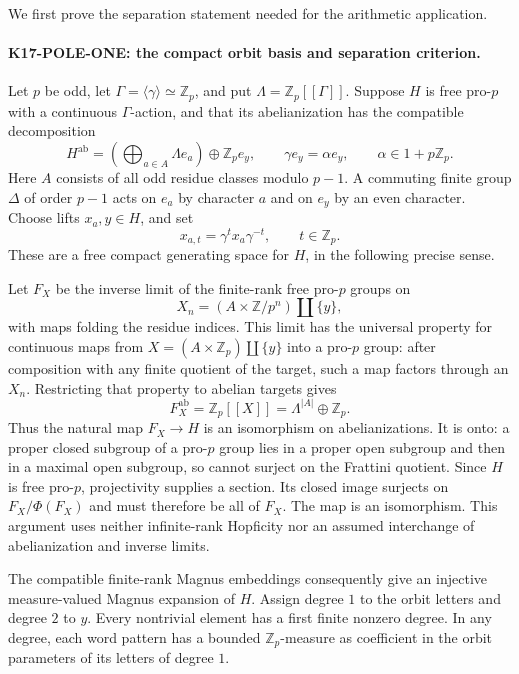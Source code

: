 \documentclass[11pt,a4paper]{article}
\theoremstyle{definition}
\begin{document}
We first prove the separation statement needed for the arithmetic application.

\paragraph{K17-POLE-ONE: the compact orbit basis and separation criterion.}
Let $p$ be odd, let $\Gamma=\langle\gamma\rangle\simeq\mathbb Z_p$, and put $\Lambda=\mathbb Z_p[[\Gamma]]$. Suppose $H$ is free pro-$p$ with a continuous $\Gamma$-action, and that its abelianization has the compatible decomposition
\[
 H^{\mathrm{ab}}=
 \left(\bigoplus_{a\in A}\Lambda e_a\right)\oplus\mathbb Z_p e_y,
 \qquad \gamma e_y=\alpha e_y,\qquad \alpha\in1+p\mathbb Z_p.       \tag{N.1}
\]
Here $A$ consists of all odd residue classes modulo $p-1$. A commuting finite group $\Delta$ of order $p-1$ acts on $e_a$ by character $a$ and on $e_y$ by an even character. Choose lifts $x_a,y\in H$, and set
\[
 x_{a,t}=\gamma^t x_a\gamma^{-t},\qquad t\in\mathbb Z_p.
\]
These are a free compact generating space for $H$, in the following precise sense.

Let $F_X$ be the inverse limit of the finite-rank free pro-$p$ groups on
\[
 X_n=(A\times\mathbb Z/p^n)\amalg\{y\},
\]
with maps folding the residue indices. This limit has the universal property for continuous maps from $X=(A\times\mathbb Z_p)\amalg\{y\}$ into a pro-$p$ group: after composition with any finite quotient of the target, such a map factors through an $X_n$. Restricting that property to abelian targets gives
\[
 F_X^{\mathrm{ab}}=\mathbb Z_p[[X]]=
 \Lambda^{|A|}\oplus\mathbb Z_p.
\]
Thus the natural map $F_X\to H$ is an isomorphism on abelianizations. It is onto: a proper closed subgroup of a pro-$p$ group lies in a proper open subgroup and then in a maximal open subgroup, so cannot surject on the Frattini quotient. Since $H$ is free pro-$p$, projectivity supplies a section. Its closed image surjects on $F_X/\Phi(F_X)$ and must therefore be all of $F_X$. The map is an isomorphism. This argument uses neither infinite-rank Hopficity nor an assumed interchange of abelianization and inverse limits.

The compatible finite-rank Magnus embeddings consequently give an injective measure-valued Magnus expansion of $H$. Assign degree $1$ to the orbit letters and degree $2$ to $y$. Every nontrivial element has a first finite nonzero degree. In any degree, each word pattern has a bounded $\mathbb Z_p$-measure as coefficient in the orbit parameters of its letters of degree $1$.
\end{document}
